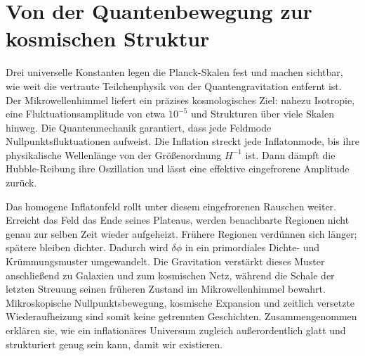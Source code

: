 \section{Von der Quantenbewegung zur kosmischen Struktur}

Drei universelle Konstanten legen die Planck-Skalen fest und machen sichtbar, wie weit die vertraute Teilchenphysik von der Quantengravitation entfernt ist. Der Mikrowellenhimmel liefert ein präzises kosmologisches Ziel: nahezu Isotropie, eine Fluktuationsamplitude von etwa \(10^{-5}\) und Strukturen über viele Skalen hinweg. Die Quantenmechanik garantiert, dass jede Feldmode Nullpunktsfluktuationen aufweist. Die Inflation streckt jede Inflatonmode, bis ihre physikalische Wellenlänge von der Größenordnung \(H^{-1}\) ist. Dann dämpft die Hubble-Reibung ihre Oszillation und lässt eine effektive eingefrorene Amplitude zurück.

Das homogene Inflatonfeld rollt unter diesem eingefrorenen Rauschen weiter. Erreicht das Feld das Ende seines Plateaus, werden benachbarte Regionen nicht genau zur selben Zeit wieder aufgeheizt. Frühere Regionen verdünnen sich länger; spätere bleiben dichter. Dadurch wird \(\delta\phi\) in ein primordiales Dichte- und Krümmungsmuster umgewandelt. Die Gravitation verstärkt dieses Muster anschließend zu Galaxien und zum kosmischen Netz, während die Schale der letzten Streuung seinen früheren Zustand im Mikrowellenhimmel bewahrt. Mikroskopische Nullpunktsbewegung, kosmische Expansion und zeitlich versetzte Wiederaufheizung sind somit keine getrennten Geschichten. Zusammengenommen erklären sie, wie ein inflationäres Universum zugleich außerordentlich glatt und strukturiert genug sein kann, damit wir existieren.